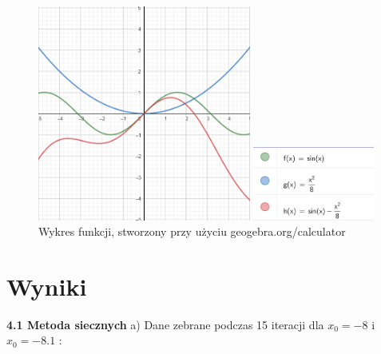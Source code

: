 \documentclass{article}
\begin{document}
\begin{figure}[h!]
\begin{center}
\begin{minipage}[b]{5cm}
\centering
\includegraphics[width=7cm]{wykresy.png}
\end{minipage}
\hfill
\begin{minipage}[b]{3cm}
\centering
\includegraphics[width=4cm]{do_wykresow.png}
\end{minipage}
\caption{Wykres funkcji, stworzony przy użyciu geogebra.org/calculator}
\label{rys1}
\end{center}
\end{figure}

\section{Wyniki}
\textbf{4.1 Metoda siecznych}
\newline\newline
a) Dane zebrane podczas 15 iteracji dla $x_0=-8$ i $x_0=-8.1$ :
\end{document}
